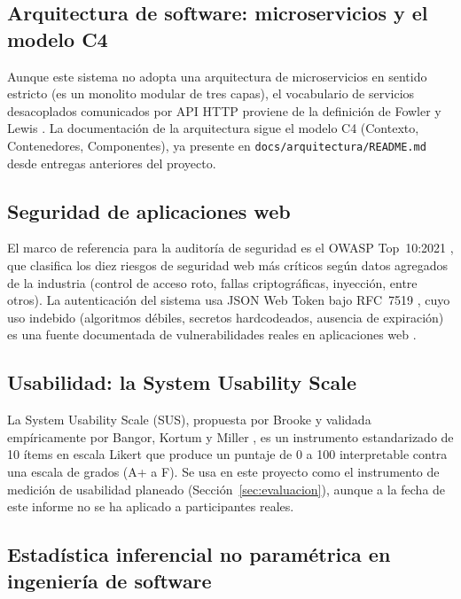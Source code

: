 \subsection{Arquitectura de software: microservicios y el modelo C4}

Aunque este sistema no adopta una arquitectura de microservicios en sentido estricto (es un monolito
modular de tres capas), el vocabulario de servicios desacoplados comunicados por API HTTP proviene de la
definición de Fowler y Lewis \cite{fowler2014}. La documentación de la arquitectura sigue el modelo C4
(Contexto, Contenedores, Componentes), ya presente en \texttt{docs/arquitectura/README.md} desde
entregas anteriores del proyecto.

\subsection{Seguridad de aplicaciones web}

El marco de referencia para la auditoría de seguridad es el OWASP Top~10:2021 \cite{owasp2021}, que
clasifica los diez riesgos de seguridad web más críticos según datos agregados de la industria (control
de acceso roto, fallas criptográficas, inyección, entre otros). La autenticación del sistema usa JSON Web
Token bajo RFC~7519 \cite{jwt2019}, cuyo uso indebido (algoritmos débiles, secretos hardcodeados, ausencia
de expiración) es una fuente documentada de vulnerabilidades reales en aplicaciones web
\cite{lu2018,rezaeinasab2022}.

\subsection{Usabilidad: la System Usability Scale}

La System Usability Scale (SUS), propuesta por Brooke \cite{brooke1996} y validada empíricamente por
Bangor, Kortum y Miller \cite{bangor2008}, es un instrumento estandarizado de 10 ítems en escala Likert
que produce un puntaje de 0 a 100 interpretable contra una escala de grados (A+ a F). Se usa en este
proyecto como el instrumento de medición de usabilidad planeado (Sección~\ref{sec:evaluacion}), aunque a
la fecha de este informe no se ha aplicado a participantes reales.

\subsection{Estadística inferencial no paramétrica en ingeniería de software}

